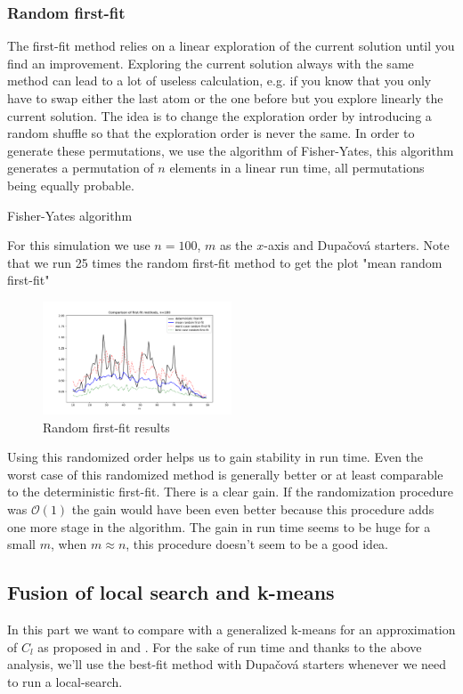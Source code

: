 \documentclass{amsart}
\begin{document}
\subsubsection{Random first-fit}
The first-fit method relies on a linear exploration of the current solution until you find an improvement. Exploring the current solution always with the same method can lead to a lot of useless calculation, e.g. if you know that you only have to swap either the last atom or the one before but you explore linearly the current solution. The idea is to change the exploration order by introducing a random shuffle so that the exploration order is never the same. In order to generate these permutations, we use the algorithm of Fisher-Yates, this algorithm generates a permutation of $n$ elements in a linear run time, all permutations being equally probable.
\begin{algorithm}\caption{Fisher-Yates algorithm}\label{fisher yat}
\end{algorithm}
For this simulation we use $n=100$, $m$ as the $x$-axis and Dupačová starters. Note that we run 25 times the random first-fit method to get the plot "mean random first-fit"
\begin{figure}[!h]
    \centering
    \includegraphics[width=0.5\textwidth]{plots/random first fit.pdf}
    \caption{Random first-fit results}
    \label{random ff}
\end{figure}
Using this randomized order helps us to gain stability in run time. Even the worst case of this randomized method is generally better or at least comparable to the deterministic first-fit. There is a clear gain. If the randomization procedure was $\mathcal{O}\left(1\right)$ the gain would have been even better because this procedure adds one more stage in the algorithm. The gain in run time seems to be huge for a small $m$, when $m\approx n$, this procedure doesn't seem to be a good idea.
\subsection{Fusion of local search and k-means}
In this part we want to compare   with a generalized k-means for an approximation of $C_l$ as proposed in  and . For the sake of run time and thanks to the above analysis, we'll use the best-fit method with Dupačová starters whenever we need to run a local-search.
\end{document}
